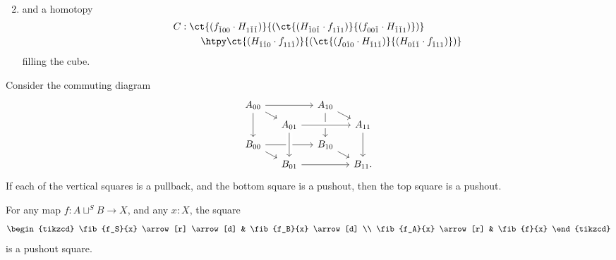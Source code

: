 \begin{defn}
\begin{enumerate}
\begin{align*}
\end{align*}
\item and a homotopy 
\begin{align*}
C & : \ct{(f_{\check{1}00}\cdot H_{1\check{1}\check{1}})}{(\ct{(H_{\check{1}0\check{1}}\cdot f_{1\check{1}1})}{(f_{00\check{1}}\cdot H_{\check{1}\check{1}1})})} \\
& \qquad \htpy \ct{(H_{\check{1}\check{1}0}\cdot f_{11\check{1}})}{(\ct{(f_{0\check{1}0}\cdot H_{\check{1}1\check{1}})}{(H_{0\check{1}\check{1}}\cdot f_{\check{1}11})})}
\end{align*}
filling the cube.
\end{enumerate}
\end{defn}

\begin{thm}
Consider the commuting diagram
\begin{equation*}
\begin{tikzcd}[column sep=small,row sep=tiny]
A_{00} \arrow[rr] \arrow[dr] \arrow[dd] & & A_{10} \arrow[dd] \arrow[dr] \\
& A_{01} \arrow[rr,crossing over] & & A_{11} \arrow[dd] \\
B_{00} \arrow[rr] \arrow[dr] & & B_{10} \arrow[dr] \\
& B_{01} \arrow[from=uu,crossing over] \arrow[rr] & & B_{11}.
\end{tikzcd}
\end{equation*}
If each of the vertical squares is a pullback, and the bottom square  is a pushout, then the top square is a pushout.
\end{thm}

\begin{cor}
For any map $f:A\sqcup^S B\to X$, and any $x:X$, the square
\begin{equation*}
\begin{tikzcd}
\fib{f_S}{x} \arrow[r] \arrow[d] & \fib{f_B}{x} \arrow[d] \\
\fib{f_A}{x} \arrow[r] & \fib{f}{x}
\end{tikzcd}
\end{equation*}
is a pushout square.
\end{cor}

